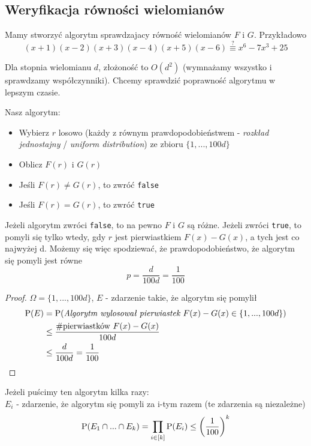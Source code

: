 \subsection{Weryfikacja równości wielomianów}
Mamy stworzyć algorytm sprawdzajacy równość wielomianów \(F\) i \(G\). Przykładowo \\
\[
	(x+1)(x-2)(x+3)(x-4)(x+5)(x-6) \overset{?}{\equiv} x^6 - 7x^3 + 25
\]

Dla stopnia wielomianu \(d\), złożoność to \(O(d^2)\) (wymnażamy wszystko i sprawdzamy współczynniki). Chcemy sprawdzić poprawność algorytmu w lepszym czasie.

Nasz algorytm:
\begin{itemize}
    \item Wybierz \(r\) losowo (każdy z równym prawdopodobieństwem - \textit{rozkład jednostajny} / \textit{uniform distribution}) ze zbioru \(\{1,...,100d\}\)
	\item Oblicz \(F(r)\) i \(G(r)\)
    \item Jeśli \(F(r) \neq G(r)\), to zwróć \texttt{false}
    \item Jeśli \(F(r) = G(r)\), to zwróć \texttt{true}
\end{itemize}

Jeżeli algorytm zwróci \texttt{false}, to na pewno \(F\) i \(G\) są różne. Jeżeli zwróci \texttt{true}, to pomyli się tylko wtedy, gdy \(r\) jest pierwiastkiem \(F(x) - G(x)\), a tych jest co najwyżej d. Możemy się więc spodziewać, że prawdopodobieństwo, że algorytm się pomyli jest równe
\[
	p = \frac{d}{100d} = \frac{1}{100}
\]

\begin{proof}
	\(\Omega = \{1,...,100d\}\), \(E\) - zdarzenie takie, że algorytm się pomylił
	\begin{align*}
		\operatorname{P}(E) &= \operatorname{P}(\textit{Algorytm wylosował pierwiastek $F(x) - G(x) \in \{1, ..., 100d\}$}) \\
		&\leq \frac{\#\text{pierwiastków } F(x) - G(x)}{100d} \\
		&\leq \frac{d}{100d} = \frac{1}{100}
	\end{align*}
\end{proof}

\noindent Jeżeli puścimy ten algorytm kilka razy: \\
\(E_i\) - zdarzenie, że algorytm się pomyli za i-tym razem (te zdarzenia są niezależne) \\
\[
	\operatorname{P}(E_1 \cap ... \cap E_k) = \prod_{i \in [k]}\operatorname{P}(E_i) \leq \left(\frac{1}{100}\right)^k
\]



